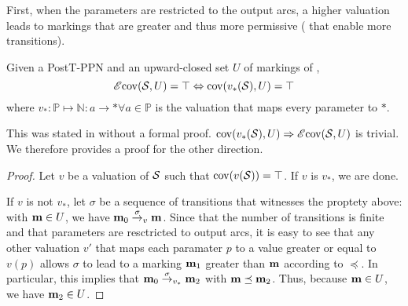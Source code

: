 First, when the parameters are restricted to the output arcs, a higher valuation leads to markings that are greater and thus more permissive ( that enable more transitions).

\begin{theo}
  Given a PostT-\ac{PPN} \SPTPm and an upward-closed set $U$ of markings of \PPN, \[\operatorname{\mathscr{E}cov}(\mathcal{S}, U) = \top \Leftrightarrow \operatorname{cov}(v_*(\mathcal{S}), U) = \top\] where $v_* : \mathbb{P} \mapsto \mathbb{N} : a \rightarrow * \forall a \in \mathbb{P}$ is the valuation that maps every parameter to $*$.
\end{theo}

This was stated in \cite{David17} without a formal proof.
$\operatorname{cov}(v_*(\mathcal{S}), U) \Rightarrow \operatorname{\mathscr{E}cov}(\mathcal{S}, U)$ is trivial.
We therefore provides a proof for the other direction.


\begin{proof}
  Let $v$ be a valuation of $\mathcal{S}$ such that $\operatorname{cov}(v(\mathcal{S})) = \top$.
  If $v$ is $v_*$, we are done.

  If $v$ is not $v_*$, let $\sigma$ be a sequence of transitions that witnesses the proptety above: with $\mathbf{m} \in U$, we have $\mathbf{m}_0 \stackrel{\sigma}{\to}_v \mathbf{m}$.
  Since that the number of transitions is finite and that parameters are resctricted to output arcs, it is easy to see that any other valuation $v'$ that maps each paramater $p$ to a value greater or equal to $v(p)$ allows $\sigma$ to lead to a marking $\mathbf{m}_1$ greater than $\mathbf{m}$ according to $\preceq$.
  In particular, this implies that $\mathbf{m}_0 \stackrel{\sigma}{\to}_{v_*} \mathbf{m}_2$ with $\mathbf{m} \preceq \mathbf{m}_2$.
  Thus, because $\mathbf{m} \in U$, we have $\mathbf{m}_2 \in U$.
\end{proof}
